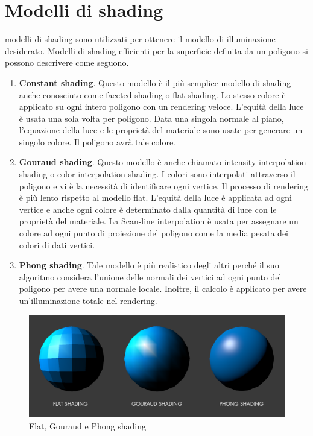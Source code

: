 \documentclass[9pt,a4paper,twoside]{tau}
\begin{document}
\section{Modelli di shading}
 modelli di shading sono utilizzati per ottenere il modello di illuminazione desiderato. Modelli di shading efficienti per la superficie definita da un poligono si possono descrivere come seguono.
\begin{enumerate}
	\item \textbf{Constant shading}. Questo modello è il più semplice modello di shading anche conosciuto come faceted shading o flat shading. Lo stesso colore è applicato su ogni intero poligono con un rendering veloce. L'equità della luce è usata una sola volta per poligono. Data una singola normale al piano, l'equazione della luce e le proprietà del materiale sono usate per generare un singolo colore. Il poligono avrà tale colore.
		
	\item \textbf{Gouraud shading}. Questo modello è anche chiamato intensity interpolation shading o color interpolation shading. I colori sono interpolati attraverso il poligono e vi è la necessità di identificare ogni vertice. Il processo di rendering è più lento rispetto al modello flat. L'equità della luce è applicata ad ogni vertice e anche ogni colore è determinato dalla quantità di luce con le proprietà del materiale. La Scan-line interpolation è usata per assegnare un colore ad ogni punto di proiezione del poligono come la media pesata dei colori di dati vertici.
	\item \textbf{Phong shading}. Tale modello è più realistico degli altri perché il suo algoritmo considera l'unione delle normali dei vertici ad ogni punto del poligono per avere una normale locale. Inoltre, il calcolo è applicato per avere un'illuminazione totale nel rendering.
\end{enumerate}
\begin{figure}[H]
    \centering
    \includegraphics[width=0.7\columnwidth]{Figures/07.png}
    \caption{Flat, Gouraud e Phong shading}
    \label{fig:figure}
\end{figure}	
\end{document}
